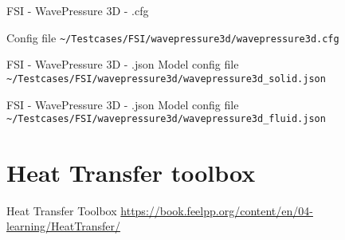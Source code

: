 \begin{frame}{FSI - WavePressure 3D - .cfg}

Config file \lstinline{~/Testcases/FSI/wavepressure3d/wavepressure3d.cfg}

\vspace{5mm}


\end{frame}


\begin{frame}{FSI - WavePressure 3D - .json}
Model config file \lstinline{~/Testcases/FSI/wavepressure3d/wavepressure3d_solid.json}
\vspace{5mm}

\end{frame}


\begin{frame}{FSI - WavePressure 3D - .json}
Model config file \lstinline{~/Testcases/FSI/wavepressure3d/wavepressure3d_fluid.json}
\vspace{5mm}

\end{frame}



\section[HeatTransfer]{Heat Transfer toolbox}

\begin{frame}[standout]{Heat Transfer Toolbox}
  \url{https://book.feelpp.org/content/en/04-learning/HeatTransfer/}
\end{frame}






